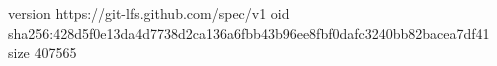 version https://git-lfs.github.com/spec/v1
oid sha256:428d5f0e13da4d7738d2ca136a6fbb43b96ee8fbf0dafc3240bb82bacea7df41
size 407565
